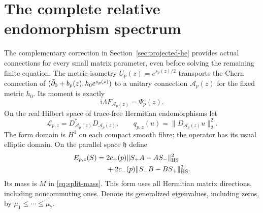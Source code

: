 \section{The complete relative endomorphism spectrum}
\label{sec:relative-spectrum}

The complementary correction in Section~\ref{sec:projected-he}
provides actual connections for every small matrix parameter,
even before solving the remaining finite equation.
The metric isometry $U_p(z)=e^{s_p(z)/2}$ transports the
Chern connection of $(\bar\partial_0+b_p(z),h_0e^{s_p(z)})$ to a
unitary connection $\mathcal A_p(z)$ for the fixed metric
$h_0$. Its moment is exactly
\[
                 \mathrm i\Lambda F_{\mathcal A_p(z)}=\Psi_p(z).
\]
On the real Hilbert space of trace-free Hermitian endomorphisms
let
\begin{equation}\label{eq:actual-rough-form}
 \mathcal L_{p,z}=D_{\mathcal A_p(z)}^*D_{\mathcal A_p(z)},
 \qquad q_{p,z}(u)=\|D_{\mathcal A_p(z)}u\|_2^2.
\end{equation}
The form domain is $H^1$ on each compact smooth fibre;
the operator has its usual elliptic domain. On the parallel
space $\mathfrak h$ define
\begin{equation}\label{eq:finite-bundle-energy}
 \begin{split}
 E_{p,z}(S)={}&2c_+(p)\|S_+A-AS_-\|_{\rm HS}^2\\
             &+2c_-(p)\|S_-B-BS_+\|_{\rm HS}^2.
 \end{split}
\end{equation}
Its mass is $M$ in \eqref{eq:split-mass}. This form uses
all Hermitian matrix directions, including noncommuting
ones. Denote its generalized eigenvalues, including zeros,
by $\mu_1\le\cdots\le\mu_7$.

